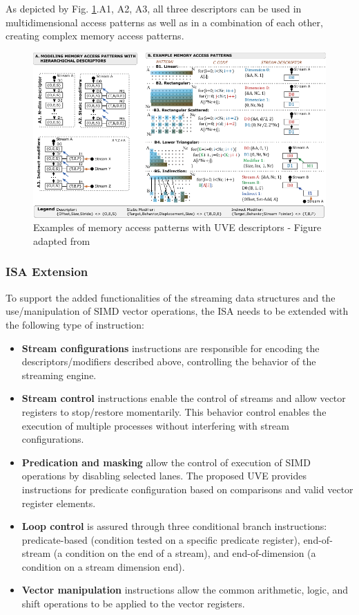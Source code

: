 As depicted by Fig. \ref{fig:stream-descriptors}.A1, A2, A3, all three descriptors can be used in multidimensional access patterns as well as in a combination of each other, creating complex memory access patterns.

\begin{figure}[H]
	\begin{center}
 		\includegraphics[width=.87\linewidth]{images/UVE-Descriptors.pdf}
 		\caption{Examples of memory access patterns with UVE descriptors - Figure adapted from \cite{uve-paper}}
 		\label{fig:stream-descriptors}
	\end{center} 
\end{figure}



\subsubsection{ISA Extension}
To support the added functionalities of the streaming data structures and the use/manipulation of SIMD vector operations, the ISA needs to be extended with the following type of instruction: 
\begin{itemize}
    \item \textbf{Stream configurations} instructions are responsible for encoding the descriptors/modifiers described above, controlling the behavior of the streaming engine. 

    \item \textbf{Stream control} instructions enable the control of streams and allow vector registers to stop/restore momentarily. This behavior control enables the execution of multiple processes without interfering with stream configurations.

    \item \textbf{Predication and masking} allow the control of execution of SIMD operations by disabling selected lanes. The proposed UVE provides instructions for predicate configuration based on comparisons and valid vector register elements.

    \item \textbf{Loop control} is assured through three conditional branch instructions: predicate-based (condition tested on a specific predicate register), end-of-stream (a condition on the end of a stream), and end-of-dimension (a condition on a stream dimension end).

    \item \textbf{Vector manipulation} instructions allow the common arithmetic, logic, and shift operations to be applied to the vector registers.
\end{itemize}



